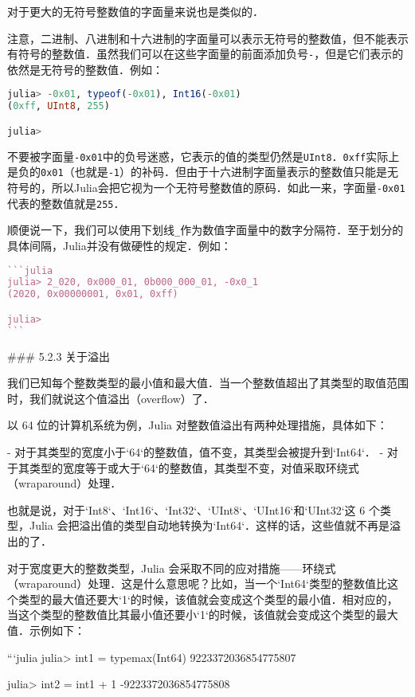 对于更大的无符号整数值的字面量来说也是类似的．

注意，二进制、八进制和十六进制的字面量可以表示无符号的整数值，但不能表示有符号的整数值．虽然我们可以在这些字面量的前面添加负号\verb|-|，但是它们表示的依然是无符号的整数值．例如：

\begin{lstlisting}[language=julia]
julia> -0x01, typeof(-0x01), Int16(-0x01)
(0xff, UInt8, 255)

julia> 
\end{lstlisting}

不要被字面量\verb|-0x01|中的负号迷惑，它表示的值的类型仍然是\verb|UInt8|．\verb|0xff|实际上是负的\verb|0x01|（也就是\verb|-1|）的补码．但由于十六进制字面量表示的整数值只能是无符号的，所以Julia会把它视为一个无符号整数值的原码．如此一来，字面量\verb|-0x01|代表的整数值就是\verb|255|．

顺便说一下，我们可以使用下划线\verb|_|作为数值字面量中的数字分隔符．至于划分的具体间隔，Julia并没有做硬性的规定．例如：

\begin{lstlisting}[language=julia]
```julia
julia> 2_020, 0x000_01, 0b000_000_01, -0x0_1
(2020, 0x00000001, 0x01, 0xff)

julia> 
```
\end{lstlisting}

### 5.2.3 关于溢出

我们已知每个整数类型的最小值和最大值．当一个整数值超出了其类型的取值范围时，我们就说这个值溢出（overflow）了．

以 64 位的计算机系统为例，Julia 对整数值溢出有两种处理措施，具体如下：

- 对于其类型的宽度小于`64`的整数值，值不变，其类型会被提升到`Int64`．
- 对于其类型的宽度等于或大于`64`的整数值，其类型不变，对值采取环绕式（wraparound）处理．

也就是说，对于`Int8`、`Int16`、`Int32`‌、`UInt8`、`UInt16`和`UInt32`这 6 个类型，Julia 会把溢出值的类型自动地转换为`Int64`．这样的话，这些值就不再是溢出的了．

对于宽度更大的整数类型，Julia 会采取不同的应对措施——环绕式（wraparound）处理．这是什么意思呢？比如，当一个`Int64`类型的整数值比这个类型的最大值还要大`1`的时候，该值就会变成这个类型的最小值．相对应的，当这个类型的整数值比其最小值还要小`1`的时候，该值就会变成这个类型的最大值．示例如下：

```julia
julia> int1 = typemax(Int64)
9223372036854775807

julia> int2 = int1 + 1
-9223372036854775808

